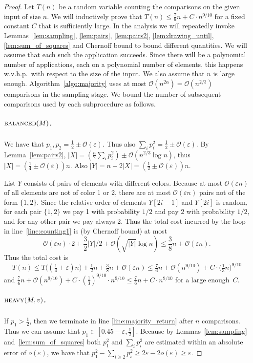\documentclass{article}[11pt,a4paper]
\newcommand{\bigo}{\mathcal{O}}
\begin{document}
\begin{proof}
Let $T(n)$ be a random variable counting the comparisons on the given input of size $n$.
We will inductively prove that $T(n) \le \frac76n + C\cdot n^{9/10}$ for a fixed constant $C$ that is sufficiently large.
In the analysis we will repeatedly invoke Lemmas~\ref{lem:sampling}, \ref{lem:pairs}, \ref{lem:pairs2}, \ref{lem:drawing_until}, \ref{lem:sum_of_squares} and Chernoff bound to bound different quantities.
We will assume that each such the application succeeds.
Since there will be a polynomial number of applications, each on a polynomial number of elements,
this happens w.v.h.p.\ with respect to the size of the input.
We also assume that $n$ is large enough.
Algorithm~\ref{algo:majority} uses at most $\bigo(n^{2\alpha})= \bigo(n^{2/3})$ comparisons
in the sampling stage. We bound the number of subsequent comparisons used by each
subprocedure as follows.

\subparagraph*{{\normalfont $\textsc{balanced}(M)$}.}
We have that $p_1,p_2 = \frac12 \pm \bigo(\varepsilon)$. Thus also $\sum_i p_i^2 =  \frac12 \pm \bigo(\varepsilon)$. By Lemma~\ref{lem:pairs2}, $|X| = (\frac{n}{2}\sum_i p_i^2) \pm \bigo(n^{2/3} \log n)$, thus $|X| = (\frac14 \pm \bigo(\varepsilon)) n$. Also $|Y| = n - 2|X| = (\frac12 \pm \bigo(\varepsilon))n$.

List $Y$ consists of pairs of elements with different colors. Because at most $\bigo(\varepsilon n)$ of
all elements are not of color 1 or 2, there are at most $\bigo(\varepsilon n)$ pairs not
of the form $\{1,2\}$. Since the relative order of elements $Y[2i-1]$ and $Y[2i]$ is random,
for each pair $\{1,2\}$ we pay 1 with probability $1/2$ and pay 2 with probability $1/2$, and for
any other pair we pay always $2$. Thus the total cost incurred by the loop in line~\ref{line:counting1} is
(by Chernoff bound) at most
\[\bigo(\varepsilon n) \cdot 2 + \frac32 |Y|/2 + \bigo(\sqrt{|Y|}\log n) \le \frac38n \pm \bigo(\varepsilon n).\]
Thus the total cost is
\[T(n) \le T\bigl((\tfrac14+\varepsilon)n\bigr) + \tfrac{1}{2}n+\tfrac{3}{8}n+\bigo(\varepsilon n) \le \tfrac76n + \bigo(n^{9/10}) + C\cdot\bigl(\tfrac13n\bigr)^{9/10}\]
and $\frac76n + \bigo(n^{9/10})+C\cdot(\frac13)^{9/10}\cdot n^{9/10} \le \frac76n+ C \cdot n^{9/10}$ for a large enough~$C$.

\subparagraph*{{\normalfont $\textsc{heavy}(M,v)$}.}
If $p_1 > \frac12$, then we terminate in line \ref{line:majority_return} after $n$ comparisons.
Thus we can assume that $p_1\in [0.45-\varepsilon,\frac12]$.
Because by Lemmas~\ref{lem:sampling} and~\ref{lem:sum_of_squares} both
$p_1^2$ and $\sum_i p_i^2$ are estimated within an absolute error of $o(\varepsilon)$,
we have that $p_1^2 - \sum_{i\geq 2}p_i^2 \ge 2\varepsilon - 2o(\varepsilon) \ge \varepsilon$.


\end{proof}
\end{document}
